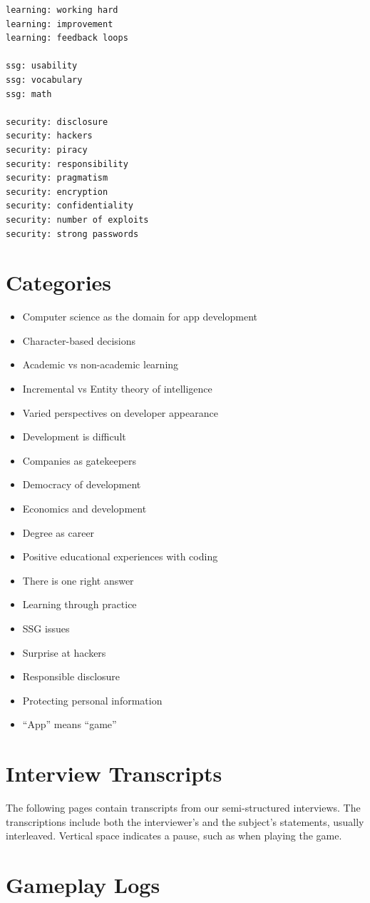\documentclass[letterpaper]{article}
\begin{document}
\begin{multicols}{2}
\begin{verbatim}
learning: working hard
learning: improvement
learning: feedback loops

ssg: usability
ssg: vocabulary
ssg: math

security: disclosure
security: hackers
security: piracy
security: responsibility
security: pragmatism
security: encryption
security: confidentiality
security: number of exploits
security: strong passwords
\end{verbatim}
\end{multicols}

\clearpage
\section{Categories}
\label{appendix:categories}
\begin{itemize}
\item[] Computer science as the domain for app development
\item[] Character-based decisions
\item[] Academic vs non-academic learning
\item[] Incremental vs Entity theory of intelligence
\item[] Varied perspectives on developer appearance
\item[] Development is difficult
\item[] Companies as gatekeepers
\item[] Democracy of development
\item[] Economics and development
\item[] Degree as career
\item[] Positive educational experiences with coding
\item[] There is one right answer
\item[] Learning through practice
\item[] SSG issues
\item[] Surprise at hackers
\item[] Responsible disclosure
\item[] Protecting personal information
\item[] ``App'' means ``game''
\end{itemize}

\clearpage
\section{Interview Transcripts}
\label{appendix:transcripts}
The following pages contain transcripts from our semi-structured
interviews. The transcriptions include both the interviewer's
and the subject's statements, usually interleaved. Vertical space
indicates a pause, such as when playing the game.



\clearpage
\section{Gameplay Logs}
\label{appendix:logs}

\end{document}

